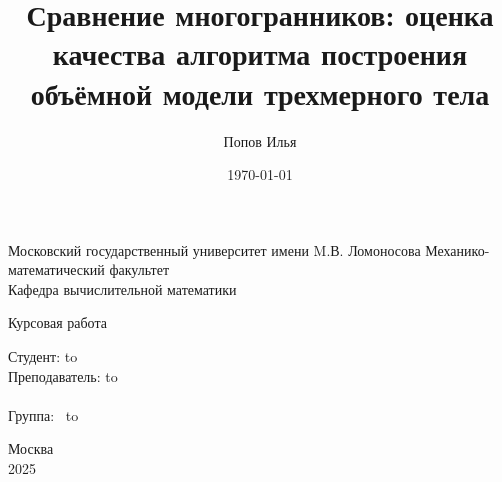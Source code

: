 \documentclass[a4paper,14pt]{extarticle}
\author{Попов Илья}
\begin{document}
\begin{titlepage}
    \newpage
    \begin{center}
        Московский государственный университет имени M.В. Ломоносова
        Механико-математический факультет\\
        Кафедра вычислительной математики \\
    \end{center}

    \vspace{8em}

    \begin{center}
        \Large Курсовая работа \\
    \end{center}

    \vspace{2em}

    \begin{center}
        \textsc{\textbf{}}
    \end{center}

    \vspace{20em}

    \newbox{\lbox}
    \newlength{\maxl}
    \setlength{\maxl}{\wd\lbox}
    \hfill\parbox{13cm}{
        \hspace*{5cm}\hspace*{-5cm}Студент: \qquad\qquad\hbox to \\
        \hspace*{5cm}\hspace*{-5cm}Преподаватель: \hbox to \\
        \\
        \hspace*{5cm}\hspace*{-5cm}Группа:\qquad\qquad $\;\:$ \hbox to\\
    }

    \vspace{\fill}

    \begin{center}
        Москва \\2025
    \end{center}

\end{titlepage}
\newpage


\title{Сравнение многогранников: оценка качества алгоритма построения объёмной модели трехмерного тела}
\date{\today}
\end{document}
